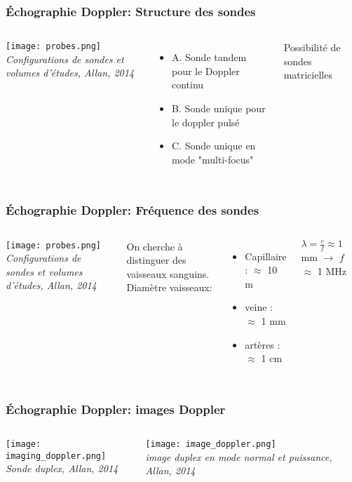 \documentclass{beamer}
\begin{document}
\begin{frame}
\frametitle{\'Echographie Doppler: Structure des sondes}
\begin{columns}
\column{60mm}
\begin{center}
\texttt{[image: probes.png]}\\
\textit{\footnotesize Configurations de sondes et volumes d'études, Allan, 2014}
\end{center}
\column{60mm}
\begin{itemize}
\item A. Sonde tandem pour le Doppler continu
\vspace{0.5cm}
\item B. Sonde unique pour le doppler pulsé 
\vspace{0.5cm}
\item C. Sonde unique en mode "multi-focus"
\end{itemize}
\vspace{0.4cm}
Possibilité de sondes matricielles 
\end{columns}
\end{frame}

\begin{frame}
\frametitle{\'Echographie Doppler: Fréquence des sondes}
\begin{columns}
\column{60mm}
\begin{center}
\texttt{[image: probes.png]}\\
\textit{\footnotesize Configurations de sondes et volumes d'études, Allan, 2014}
\end{center}
\column{60mm}
On cherche à distinguer des vaisseaux sanguins.\\
\vspace{0.5cm}
Diamètre vaisseaux:
\begin{itemize}
\item Capillaire : $\approx$ 10 \textmu m
\item veine : $\approx$ 1 mm
\item artères : $\approx$ 1 cm
\end{itemize}
\vspace{0.5cm}
$\lambda  =  \frac{\displaystyle c}{\displaystyle f} \approx 1$ mm $\rightarrow$ $f$ $\approx$ 1 MHz
\end{columns}
\end{frame}

\begin{frame}
\frametitle{\'Echographie Doppler: images Doppler}
\begin{columns}
\column{60mm}
\begin{center}
\texttt{[image: imaging\_doppler.png]}\\
\textit{\footnotesize Sonde duplex, Allan, 2014}
\end{center}
\column{60mm}
\begin{center}
\texttt{[image: image\_doppler.png]}\\
\textit{\footnotesize image duplex en mode normal et puissance, Allan, 2014}
\end{center}
\end{columns}
\end{frame}
\end{document}
